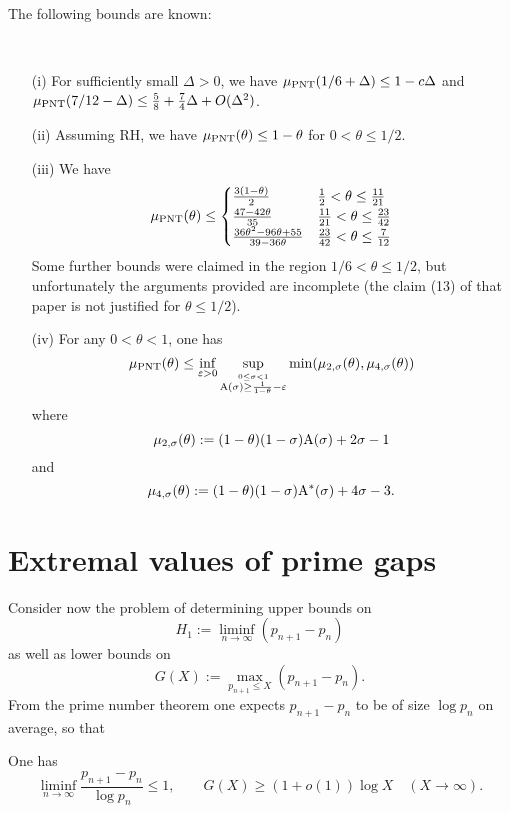 The following bounds are known:

\begin{lemma}[Bounds on $\mu$]\label{baz-bound}\
  \begin{itemize}
  \item[(i)]  \cite[Theorem 2(i)]{bazzanella-perelli}  For sufficiently small $\Delta>0$, we have $\mu_{\mathrm{PNT}}(1/6 + \Delta) \leq 1 - c\Delta$ and $\mu_{\mathrm{PNT}}(7/12-\Delta) \leq \frac{5}{8} + \frac{7}{4}\Delta + O(\Delta^2)$.
  \item[(ii)] \cite[Theorem 2(ii)]{bazzanella-perelli} Assuming RH, we have $\mu_{\mathrm{PNT}}(\theta) \leq 1-\theta$ for $0 < \theta \leq 1/2$.
    \item[(iii)] \cite[Lemma 1]{bazzanella} We have
  $$
  \mu_{\mathrm{PNT}}(\theta) \leq
  \begin{cases}
  \frac{3(1-\theta)}{2} & \frac{1}{2} < \theta \leq \frac{11}{21} \\
  \frac{47-42\theta}{35}& \frac{11}{21} < \theta \leq \frac{23}{42} \\
  \frac{36\theta^2-96\theta+55}{39-36\theta} & \frac{23}{42} < \theta \leq \frac{7}{12} \\
  \end{cases}
  $$
  Some further bounds were claimed in the region $1/6 < \theta \leq 1/2$, but unfortunately the arguments provided are incomplete (the claim (13) of that paper is not justified for $\theta \leq 1/2$).
  \item[(iv)] \cite{gafni-tao} For any $0 < \theta < 1$, one has
$$\mu_{\mathrm{PNT}}(\theta) \leq \inf_{\varepsilon>0} \sup_{\stackrel{0 \leq \sigma < 1}{\mathrm{A}(\sigma) \geq \frac{1}{1-\theta}-\varepsilon}} \min(\mu_{2,\sigma}(\theta), \mu_{4,\sigma}(\theta))$$
where
$$ \mu_{2,\sigma}(\theta) := (1-\theta)(1-\sigma) \mathrm{A}(\sigma) + 2\sigma - 1$$
and
$$ \mu_{4,\sigma}(\theta) := (1-\theta)(1-\sigma) \mathrm{A}^*(\sigma) + 4\sigma-3.$$
  \end{itemize}
\end{lemma}




\section{Extremal values of prime gaps}

Consider now the problem of determining upper bounds on
\begin{equation}\label{eqn:small-prime-gaps}
H_1 := \liminf_{n\to\infty}(p_{n + 1} - p_n)
\end{equation}
as well as lower bounds on
\begin{equation}\label{eqn:large-prime-gaps}
G(X) := \max_{p_{n + 1} \le X}(p_{n + 1} - p_n).
\end{equation}
From the prime number theorem one expects $p_{n + 1} - p_n$ to be of size $\log p_n$ on average, so that
\begin{theorem}
One has
\[
\liminf_{n\to\infty}\frac{p_{n + 1} - p_n}{\log p_n} \le 1,\qquad G(X) \ge (1 + o(1)) \log X\quad (X \to \infty).
\]
\end{theorem}

